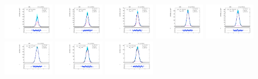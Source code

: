 \begin{figure}[htb]
\includegraphics[width=0.19\textwidth]{plots/Appendix_Recoil_Fits/ZmmMC_PF_5TeV_2G/pfu1fit_24.pdf}
\includegraphics[width=0.19\textwidth]{plots/Appendix_Recoil_Fits/ZmmMC_PF_5TeV_2G/pfu1fit_25.pdf}
\includegraphics[width=0.19\textwidth]{plots/Appendix_Recoil_Fits/ZmmMC_PF_5TeV_2G/pfu1fit_26.pdf}
\includegraphics[width=0.19\textwidth]{plots/Appendix_Recoil_Fits/ZmmMC_PF_5TeV_2G/pfu1fit_27.pdf}
\includegraphics[width=0.19\textwidth]{plots/Appendix_Recoil_Fits/ZmmMC_PF_5TeV_2G/pfu1fit_28.pdf}
\includegraphics[width=0.19\textwidth]{plots/Appendix_Recoil_Fits/ZmmMC_PF_5TeV_2G/pfu1fit_29.pdf}
\includegraphics[width=0.19\textwidth]{plots/Appendix_Recoil_Fits/ZmmMC_PF_5TeV_2G/pfu1fit_30.pdf}
\includegraphics[width=0.19\textwidth]{plots/Appendix_Recoil_Fits/ZmmMC_PF_5TeV_2G/pfu1fit_31.pdf}

\end{figure}
